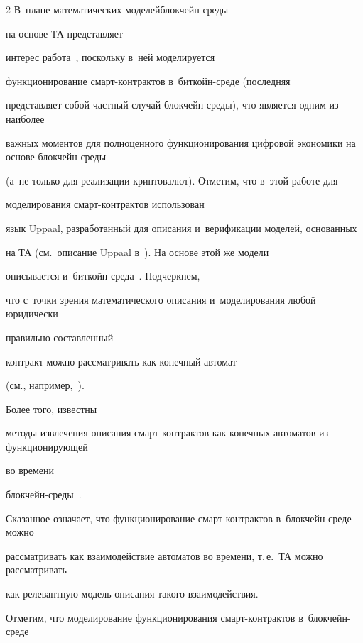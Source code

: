 \begin{multicols}{2}
В~плане математических моде\-лей\linebreak блок\-чейн-сре\-ды


на основе ТА пред\-став\-ляет\linebreak


интерес работа~\cite{Bitcoin-contract-model}, поскольку в~ней мо\-де\-ли\-ру\-ет\-ся


функционирование смарт-кон\-трак\-тов в~бит\-койн-сре\-де (последняя


пред\-став\-ля\-ет собой част\-ный случай блок\-чейн-сре\-ды), что является одним из наиболее


важных моментов для полноценного функционирования цифровой экономики на основе блок\-чейн-сре\-ды 


(а~не только для  реализации криптовалют). Отметим, что в~этой работе для


моделирования смарт-кон\-трак\-тов использован


язык Uppaal, разработанный  для описания и~верификации моделей, основанных


на ТА (см.\ описание \mbox{Uppaal} в~\cite{Uppaal-tutorial}). На основе этой же модели


описывается и~бит\-койн-сре\-да~\cite{Model-bitcoin-uppaal}. Подчеркнем,


что с~точки зрения математического описания и~моделирования любой юридически


правильно составленный


контракт можно рассматривать как конечный автомат 


(см., например,~\cite{contract-automat}).


Более того, известны


методы извлечения описания смарт-контрактов как конечных автоматов из функционирующей


во времени


блок\-чейн-среды~\cite{mining-smart-contract}.





Сказанное означает, что функционирование смарт-кон\-трак\-тов в~блок\-чейн-сре\-де можно


рас\-смат\-ри\-вать как взаимодействие автоматов во времени,  т.\,е.\ ТА можно рассматривать


как релевантную модель  описания такого взаимодействия.





Отметим, что  моделирование функционирования смарт-кон\-трак\-тов в~блок\-чейн-сре\-де 



\end{multicols}
